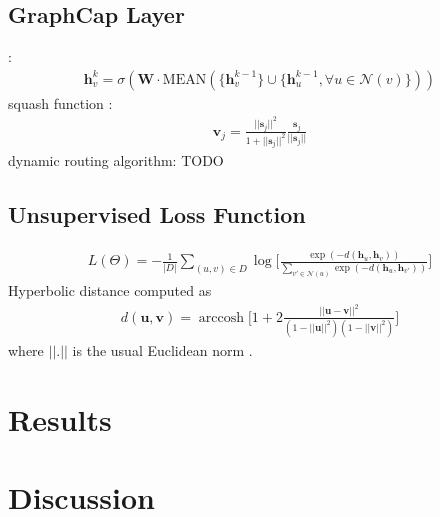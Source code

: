\documentclass{IEEEtran}
\DeclareMathOperator{\arccosh}{arccosh}
{\tiny }
\begin{document}
	\subsection{GraphCap Layer}
	\cite{hamilton2017inductive}:
	\begin{align*}
	\textbf{h}^k_v = \sigma(\textbf{W}\cdot \mathrm{MEAN}(\{\textbf{h}^{k-1}_v\}\cup\{\textbf{h}^{k-1}_u, \forall u\in \mathcal{N}(v)\}))
	\end{align*}
	squash function \cite{sabour2017dynamic}:
	\begin{align*}
	\textbf{v}_j = \frac{||\textbf{s}_j||^2}{1 + ||\textbf{s}_j||^2}
	\frac{\textbf{s}_j}{||\textbf{s}_j||}
	\end{align*}
	dynamic routing algorithm: \cite{sabour2017dynamic}
	TODO
	\subsection{Unsupervised Loss Function}
	\begin{align*}
	L(\Theta) = -\frac{1}{|D|} \sum_{(u, v) \in D} \log \bigg[\frac{\exp(-d(\textbf{h}_u, \textbf{h}_v))}{\sum_{v' \in \mathcal{N}(u)} \exp(-d(\textbf{h}_u, \textbf{h}_{v'}))} \bigg]
	\end{align*}
	Hyperbolic distance computed as 
	\begin{align*}
	d(\textbf{u}, \textbf{v}) = \arccosh \bigg[1 + 2\frac{||\textbf{u}-\textbf{v}||^2}{(1 - ||\textbf{u}||^2)(1-||\textbf{v}||^2)}\bigg]
	\end{align*}
	where $||.||$ is the usual Euclidean norm \cite{nickel2017poincar}.
	
	\section{Results}
	
	\section{Discussion}
	
	
	
	
	
\end{document}
